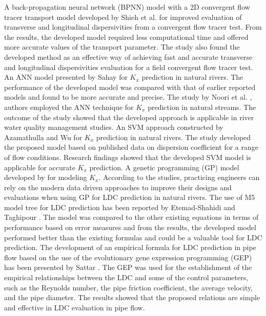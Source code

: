\documentclass[a4paper,12pt, english]{article}
\begin{document}
A back-propagation neural network (BPNN) model with a 2D convergent flow tracer transport model developed by Shieh et al. \cite{shieh2010development} for improved evaluation of transverse and longitudinal dispersivities from a convergent flow tracer test. From the results, the developed model required less computational time and offered more accurate values of the transport parameter. The study also found the developed method as an effective way of achieving fast and accurate transverse and longitudinal dispersivities evaluation for a field convergent flow tracer test. An ANN model presented by Sahay \cite{sahay2011prediction} for $K_x$ prediction in natural rivers. The performance of the developed model was compared with that of earlier reported models and found to be more accurate and precise. The study by Noori et al. \cite{noori2011framework}, authors employed the ANN technique for $K_x$ prediction in natural streams. The outcome of the study showed that the developed approach is applicable in river water quality management studies. An SVM approach constructed by Azamathulla and Wu \cite{azamathulla2011support} for $K_x$ prediction in natural rivers. The study developed the proposed model based on published data on dispersion coefficient for a range of flow conditions. Research findings showed that the developed SVM model is applicable for accurate $K_x$ prediction. A genetic programming (GP) model developed by \cite{tu2015ant} for modeling $K_x$. According to the studies, practicing engineers can rely on the modern data driven approaches to improve their designs and evaluations when using GP for LDC prediction in natural rivers. The use of M5 model tree for LDC prediction has been reported by Etemad-Shahidi and Taghipour \cite{etemad2012predicting}. The model was compared to the other existing equations in terms of performance based on error measures and from the results, the developed model performed better than the existing formulas and could be a valuable tool for LDC prediction. 
The development of an empirical formula for LDC prediction in pipe flow based on the use of the evolutionary gene expression programming (GEP) has been presented by Sattar \cite{sattar2014gene}. The GEP was used for the establishment of the empirical relationships between the LDC and some of the control parameters, such as the Reynolds number, the pipe friction coefficient, the average velocity, and the pipe diameter. The results showed that the proposed relations are simple and effective in LDC evaluation in pipe flow.
\end{document}
